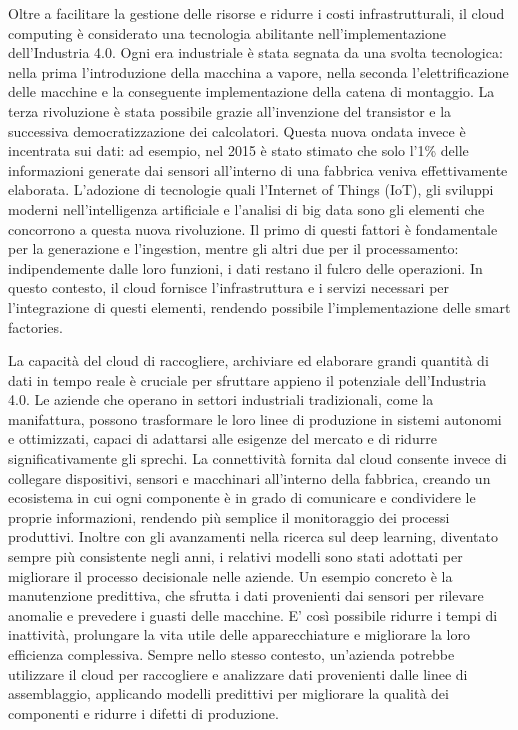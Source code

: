 Oltre a facilitare la gestione delle risorse e ridurre i costi infrastrutturali, il cloud computing è considerato una tecnologia abilitante nell'implementazione dell’Industria 4.0. Ogni era industriale è stata segnata da una svolta tecnologica: nella prima l'introduzione della macchina a vapore, nella seconda l'elettrificazione delle macchine e la conseguente implementazione della catena di montaggio. La terza rivoluzione è stata possibile grazie all'invenzione del transistor e la successiva democratizzazione dei calcolatori. Questa nuova ondata invece è incentrata sui dati: ad esempio, nel 2015 è stato stimato che solo l'1\% delle informazioni generate dai sensori all'interno di una fabbrica veniva effettivamente elaborata\cite{mckinsey}.  L’adozione di tecnologie quali l’Internet of Things (IoT), gli sviluppi moderni nell'intelligenza artificiale e l’analisi di big data sono gli elementi che concorrono a questa nuova rivoluzione. Il primo di questi fattori è fondamentale per la generazione e l'ingestion, mentre gli altri due per il processamento: indipendemente dalle loro funzioni, i dati restano il fulcro delle operazioni. In questo contesto, il cloud fornisce l'infrastruttura e i servizi necessari per l'integrazione di questi elementi, rendendo possibile l'implementazione delle smart factories. 

La capacità del cloud di raccogliere, archiviare ed elaborare grandi quantità di dati in tempo reale è cruciale per sfruttare appieno il potenziale dell’Industria 4.0. Le aziende che operano in settori industriali tradizionali, come la manifattura, possono trasformare le loro linee di produzione in sistemi autonomi e ottimizzati, capaci di adattarsi alle esigenze del mercato e di ridurre significativamente gli sprechi. La connettività fornita dal cloud consente invece di collegare dispositivi, sensori e macchinari all'interno della fabbrica, creando un ecosistema in cui ogni componente è in grado di comunicare e condividere le proprie informazioni, rendendo più semplice il monitoraggio dei processi produttivi. Inoltre con gli avanzamenti nella ricerca sul deep learning, diventato sempre più consistente negli anni, i relativi modelli sono stati adottati per migliorare il processo decisionale nelle aziende. Un esempio concreto è la manutenzione predittiva, che sfrutta i dati provenienti dai sensori per rilevare anomalie e prevedere i guasti delle macchine. E' così possibile ridurre i tempi di inattività, prolungare la vita utile delle apparecchiature e migliorare la loro efficienza complessiva. Sempre nello stesso contesto, un'azienda potrebbe utilizzare il cloud per raccogliere e analizzare dati provenienti dalle linee di assemblaggio, applicando modelli predittivi per migliorare la qualità dei componenti e ridurre i difetti di produzione. 

